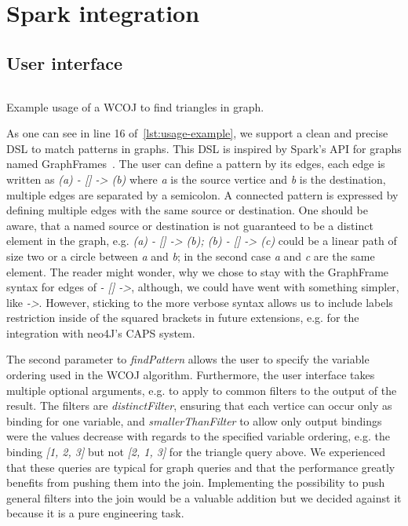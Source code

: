 \section{Spark integration}\label{sec:spark-integration}

\subsection{User interface} \label{ssec:user-interface}
\begin{listing}[H]
    \centering
    \inputminted{scala}{code/usage-example.scala}
    \caption{Example usage of a \textsc{WCOJ} to find triangles in graph.}
    \label{lst:usage-example}
\end{listing}

As one can see in line 16 %
of~\cref{lst:usage-example}, we support a clean and precise DSL to match patterns in graphs.
This DSL is inspired by Spark's API for graphs named GraphFrames~\cite{graphframe}.
The user can define a pattern by its edges, each edge is written as \textit{(a) - [] -> (b)} where \textit{a} is the
source vertice and \textit{b} is the destination, multiple edges are separated by a semicolon.
A connected pattern is expressed by defining multiple edges with the same source or destination.
One should be aware, that a named source or destination is not guaranteed to be a distinct element in the graph,
e.g. \textit{(a) - [] -> (b); (b) - [] -> (c)} could be a linear path of size two or a circle between \textit{a} and
\textit{b}; in the second case \textit{a} and \textit{c} are the same element.
The reader might wonder, why we chose to stay with the GraphFrame syntax for edges of
\textit{- [] ->}, although, we could have went with something simpler, like \textit{->}.
However, sticking to the more verbose syntax allows us to include labels restriction inside of the squared brackets
in future extensions, e.g. for the integration with neo4J's \textsc{CAPS} system.

The second parameter to \textit{findPattern} allows the user to specify the variable ordering used in the \textsc{WCOJ} algorithm.
Furthermore, the user interface takes multiple optional arguments, e.g. to apply to common filters to the output of the result.
The filters are \textit{distinctFilter}, ensuring that each vertice can occur only as binding for one variable, and
\textit{smallerThanFilter} to allow only output bindings were the values decrease with regards to the specified variable ordering,
e.g. the binding \textit{[1, 2, 3]} but not \textit{[2, 1, 3]} for the triangle query above.
We experienced that these queries are typical for graph queries and that the performance greatly benefits from pushing
them into the join.
Implementing the possibility to push general filters into the join would be a valuable addition but we decided against it because
it is a pure engineering task.

